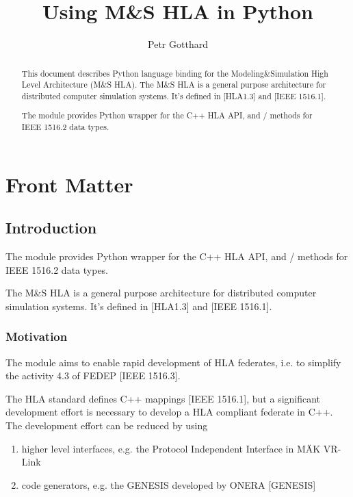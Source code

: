 \documentclass{howto}
\title{Using M\&S HLA in Python}
\author{Petr Gotthard}
\begin{document}
\maketitle

%
\ifhtml
\chapter*{Front Matter\label{front}}
\fi


\begin{abstract}
\noindent
This document describes Python language binding for the Modeling\&Simulation
High Level Architecture (M\&S HLA).
The M\&S HLA is a general purpose architecture for distributed computer
simulation systems. It's defined in [HLA1.3] and [IEEE 1516.1].

The  module provides Python wrapper for the C++ HLA API, and
/ methods for IEEE 1516.2 data types.
\end{abstract}

\tableofcontents

\section{Introduction}

The  module provides Python wrapper for the C++ HLA API, and
/ methods for IEEE 1516.2 data types.

The M\&S HLA is a general purpose architecture for distributed computer
simulation systems. It's defined in [HLA1.3] and [IEEE 1516.1].

\subsection{Motivation}

The  module aims to enable rapid development of HLA federates,
i.e. to simplify the activity 4.3 of FEDEP [IEEE 1516.3].

The HLA standard defines C++ mappings [IEEE 1516.1], but a significant
development effort is necessary to develop a HLA compliant federate in C++.
The development effort can be reduced by using
\begin{enumerate}
\item higher level interfaces, e.g. the Protocol Independent Interface in M\"{A}K VR-Link
\item code generators, e.g. the GENESIS developed by ONERA [GENESIS]
\end{enumerate}
\end{document}
